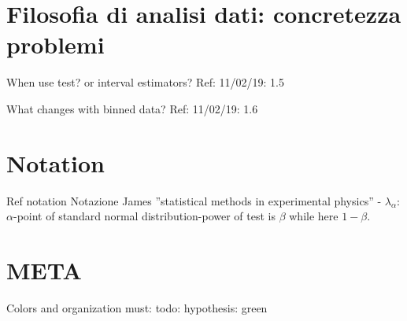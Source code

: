 \section{Filosofia di analisi dati: concretezza problemi}

\begin{frame}{When use test? or interval estimators?}\frameintoc
Ref: 11/02/19: 1.5
\end{frame}

\begin{frame}{What changes with binned data?}
Ref: 11/02/19: 1.6
\end{frame}

\section{Notation}

\begin{frame}{Ref notation}
Notazione James ''statistical methods in experimental physics'' - $\lambda_{\alpha}$: $\alpha$-point of standard normal distribution-power of test is $\beta$ while here $1-\beta$.
\end{frame}

\section{META}

\begin{frame}{Colors and organization}
must:
todo:
hypothesis: green
\end{frame}